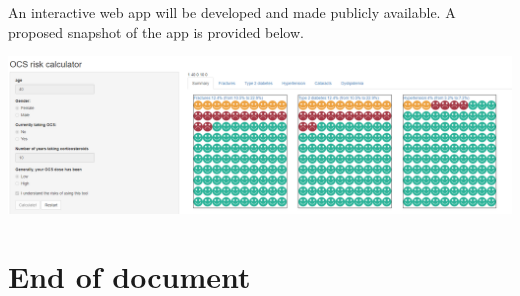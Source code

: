 \documentclass[
]{article}
\begin{document}
An interactive web app will be developed and made publicly available. A
proposed snapshot of the app is provided below.

\includegraphics{AppExample.png}

\hypertarget{end-of-document}{%
\section{End of document}\label{end-of-document}}
\end{document}
